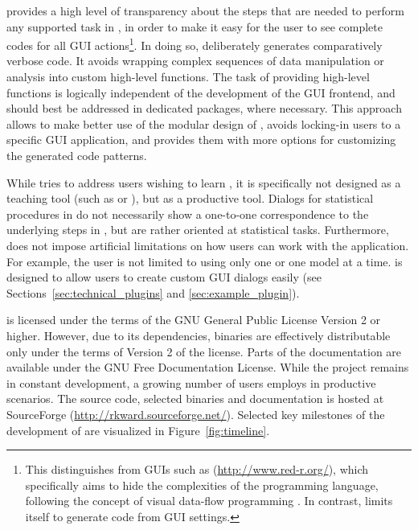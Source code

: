  provides a high level of transparency about the steps that are needed to
perform any supported task in , in order to make it easy for the user to see
complete codes for all GUI actions\footnote{
  This distinguishes  from  GUIs such as  (\url{http://www.red-r.org/}), which 
  specifically aims to hide the complexities of the  programming language, following the concept of visual data-flow 
  programming \citep{Sutherland1966}. In contrast,  limits itself to generate  code from GUI settings.
}. In doing so,  deliberately generates
comparatively verbose code. It avoids wrapping complex sequences of data
manipulation or analysis into custom high-level  functions. The task of
providing high-level functions is logically independent of the development of the
GUI frontend, and should best be addressed in dedicated  packages, where necessary.
This approach allows to make better use of the modular design of , avoids
locking-in users to a specific GUI application, and provides them with more options for
customizing the generated code patterns.

While  tries to address users wishing to learn , it is specifically not
designed as a teaching tool (such as  or ), but as
a productive tool. Dialogs for statistical procedures in  do not
necessarily show a one-to-one correspondence to the underlying steps in , but are
rather oriented at statistical tasks. Furthermore,  does not impose
artificial limitations on how users can work with the application. For example,
the user is not limited to using only one  or one model at a
time.  is designed to allow users to create custom GUI dialogs
easily (see Sections~\ref{sec:technical_plugins} and \ref{sec:example_plugin}).

 is licensed under the terms of the GNU General Public License Version 2
or higher. However, due to its dependencies,  binaries are effectively
distributable only under the terms of Version 2 of the license. Parts of the documentation are available under the
GNU Free Documentation License. While the project remains in constant development, a growing
number of users employs  in productive scenarios. The source code,
selected binaries and documentation is hosted at SourceForge
(\url{http://rkward.sourceforge.net/}). Selected key milestones of the development of  are
visualized in Figure~\ref{fig:timeline}.

